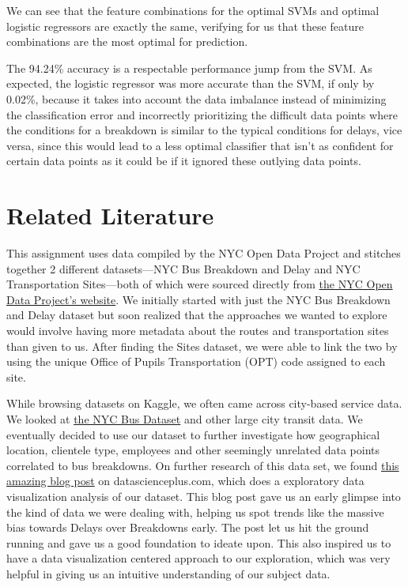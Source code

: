 \documentclass[11pt]{article}
\begin{document}
We can see that the feature combinations for the optimal SVMs and optimal logistic regressors are exactly the same, verifying for us that these feature combinations are the most optimal for prediction.

The 94.24\% accuracy is a respectable performance jump from the SVM. As expected, the logistic regressor was more accurate than the SVM, if only by 0.02\%, because it takes into account the data imbalance instead of minimizing the classification error and incorrectly prioritizing the difficult data points where the conditions for a breakdown is similar to the typical conditions for delays, vice versa, since this would lead to a less optimal classifier that isn't as confident for certain data points as it could be if it ignored these outlying data points.

\newpage
\section{Related Literature}
This assignment uses data compiled by the NYC Open Data Project and stitches together 2 different datasets---NYC Bus Breakdown and Delay and NYC Transportation Sites---both of which were sourced directly from \href{https://opendata.cityofnewyork.us/}{\color{blue}the NYC Open Data Project's website}. We initially started with just the NYC Bus Breakdown and Delay dataset but soon realized that the approaches we wanted to explore would involve having more metadata about the routes and transportation sites than given to us. After finding the Sites dataset, we were able to link the two by using the unique Office of Pupils Transportation (OPT) code assigned to each site.

While browsing datasets on Kaggle, we often came across city-based service data. We looked at \href{https://www.kaggle.com/stoney71/new-york-city-transport-statistics}{\color{blue}the NYC Bus Dataset} and other large city transit data. We eventually decided to use our dataset to further investigate how geographical location, clientele type, employees and other seemingly unrelated data points correlated to bus breakdowns. On further research of this data set, we found \href{https://datascienceplus.com/nyc-bus-delays/}{\color{blue}this amazing blog post} on datascienceplus.com, which does a exploratory data visualization analysis of our dataset. This blog post gave us an early glimpse into the kind of data we were dealing with, helping us spot trends like the massive bias towards Delays over Breakdowns early. The post let us hit the ground running and gave us a good foundation to ideate upon. This also inspired us to have a data visualization centered approach to our exploration, which was very helpful in giving us an intuitive understanding of our subject data.
\end{document}
